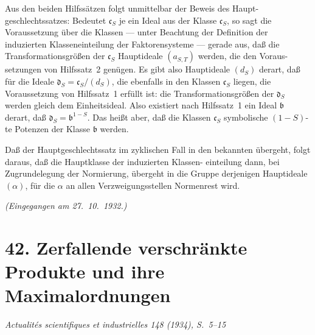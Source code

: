 \documentclass[12pt,a4paper]{article}
\theoremstyle{plain}
\begin{document}
Aus den beiden Hilfss\"atzen folgt unmittelbar der Beweis des Haupt-
geschlechtssatzes: Bedeutet $\mathfrak{c}_S$ je ein Ideal aus der Klasse $\mathfrak{c}_S$, so sagt die
Voraussetzung \"uber die Klassen --- unter Beachtung der Definition der
induzierten Klasseneinteilung der Faktorensysteme --- gerade aus, da\ss{} die
Transformationsgr\"o\ss en der $\mathfrak{c}_S$ Hauptideale $(a_{S,T})$ werden, die den Voraus-
setzungen von Hilfssatz~2 gen\"ugen. Es gibt also Hauptideale $(d_S)$ derart,
da\ss{} f\"ur die Ideale $\mathfrak{d}_S = \mathfrak{c}_S / (d_S)$, die ebenfalls in den Klassen $\mathfrak{c}_S$ liegen,
die Voraussetzung von Hilfssatz~1 erf\"ullt ist: die Transformationsgr\"o\ss en
der $\mathfrak{d}_S$ werden gleich dem Einheitsideal. Also existiert nach Hilfssatz~1
ein Ideal $\mathfrak{b}$ derart, da\ss{} $\mathfrak{d}_S = \mathfrak{b}^{1-S}$. Das hei\ss t aber, da\ss{} die Klassen $\mathfrak{c}_S$
symbolische $(1-S)$-te Potenzen der Klasse $\mathfrak{b}$ werden.

Da\ss{} der Hauptgeschlechtssatz im zyklischen Fall in den bekannten
\"ubergeht, folgt daraus, da\ss{} die Hauptklasse der induzierten Klassen-
einteilung dann, bei Zugrundelegung der Normierung, \"ubergeht in die
Gruppe derjenigen Hauptideale $(\alpha)$, f\"ur die $\alpha$ an allen Verzweigungsstellen
Normenrest wird.

\begin{flushright}
\textit{(Eingegangen am 27.\ 10.\ 1932.)}
\end{flushright}



\newpage
\section*{42. Zerfallende verschr\"ankte Produkte und ihre
Maximalordnungen}
\label{sec:zerfallende}

\begin{center}
\small\textit{Actualit\'es scientifiques et industrielles 148 (1934), S.\ 5--15}
\end{center}

\end{document}
